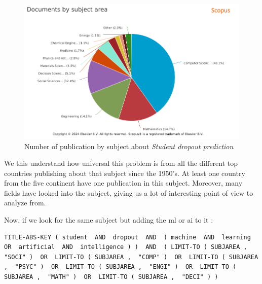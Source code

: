 \documentclass[../../main.tex]{subfiles}
\begin{document}
\begin{figure}[H]
    \centering
    \includegraphics[width=1\linewidth]{res//graph/prediction student/Scopus-Analyze-Subject.png}
    \caption{Number of publication by subject about \textit{Student dropout prediction}}
    \label{fig:nb_pub_scopus_predictstudent_subject}
\end{figure}

We this understand how universal this problem is from all the different top countries publishing about that subject since the 1950's. At least one country from the five continent have one publication in this subject. Moreover, many fields have looked into the subject, giving us a lot of interesting point of view to analyze from.

Now, if we look for the same subject but adding the \acrshort{ml} or \acrshort{ai} to it :
\begin{lstlisting}[breaklines]
TITLE-ABS-KEY ( student  AND  dropout  AND  ( machine  AND  learning  OR  artificial  AND  intelligence ) )  AND  ( LIMIT-TO ( SUBJAREA ,  "SOCI" )  OR  LIMIT-TO ( SUBJAREA ,  "COMP" )  OR  LIMIT-TO ( SUBJAREA ,  "PSYC" )  OR  LIMIT-TO ( SUBJAREA ,  "ENGI" )  OR  LIMIT-TO ( SUBJAREA ,  "MATH" )  OR  LIMIT-TO ( SUBJAREA ,  "DECI" ) )
\end{lstlisting}
\end{document}
